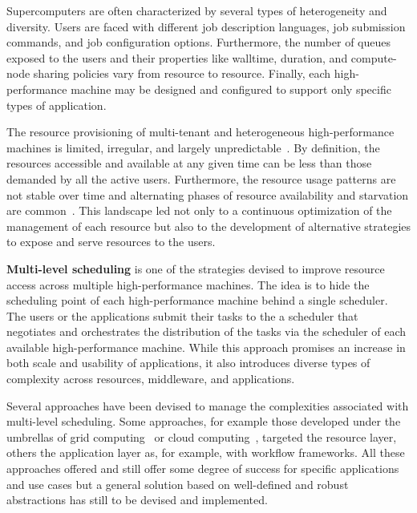 \documentclass{sig-alternate}
\begin{document}
Supercomputers are often characterized by several types of heterogeneity and
diversity. Users are faced with different job description languages, job
submission commands, and job configuration options. Furthermore, the number of
queues exposed to the users and their properties like walltime, duration, and
compute-node sharing policies vary from resource to resource. Finally, each
high-performance machine may be designed and configured to support only specific
types of application.

The resource provisioning of multi-tenant and heterogeneous high-performance
machines is limited, irregular, and largely
unpredictable~\cite{downey1997,wolski2003,li2004,tsafrir2007}. By definition,
the resources accessible and available at any given time can be less than those
demanded by all the active users. Furthermore, the resource usage patterns are
not stable over time and alternating phases of resource availability and
starvation are common~\cite{Furlani2013,Lu2013}. This landscape led not only to
a continuous optimization of the management of each resource but also to the
development of alternative strategies to expose and serve resources to the
users.


{\bf Multi-level scheduling} is one of the strategies devised to improve resource
access across multiple high-performance machines. The idea is to hide the
scheduling point of each high-performance machine behind a single scheduler. The
users or the applications submit their tasks to the a scheduler that negotiates
and orchestrates the distribution of the tasks via the scheduler of each
available high-performance machine. While this approach promises an increase in
both scale and usability of applications, it also introduces diverse types of
complexity across resources, middleware, and applications.


Several approaches have been devised to manage the complexities associated with
multi-level scheduling. Some approaches, for example those developed under the
umbrellas of grid computing~\cite{raicu2007,singh2005,ramakrishnan2006} or cloud
computing~\cite{foster2008,juve2008,villegas2012,song2009}, targeted the
resource layer, others the application layer as, for example, with workflow
frameworks. All these approaches offered and still offer some degree of success
for specific applications and use cases but a general solution based on
well-defined and robust abstractions has still to be devised and implemented.
\end{document}
